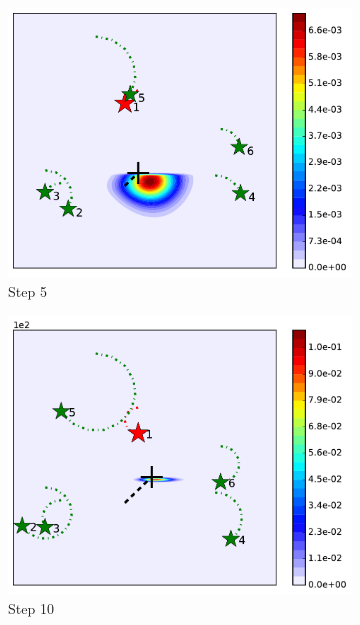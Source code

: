 \documentclass[journal]{IEEEtranTIE}
\theoremstyle{remark}
\begin{document}
\begin{figure}
\begin{subfigure}[b]{0.23\textwidth}
		\includegraphics[width=\textwidth]{figures/brg_mov_sen_mov_tar_rbt1_step5}
		\caption{Step 5}\label{fig:mov_sen_mov_tar_sing3}
	\end{subfigure}	
	\begin{subfigure}[b]{0.23\textwidth}
		\includegraphics[width=\textwidth]{figures/brg_mov_sen_mov_tar_rbt1_step10}
		\caption{Step 10}\label{fig:mov_sen_mov_tar_sing4}
	\end{subfigure}
	\begin{subfigure}[b]{0.23\textwidth}

\end{subfigure}
\end{figure}
\end{document}
